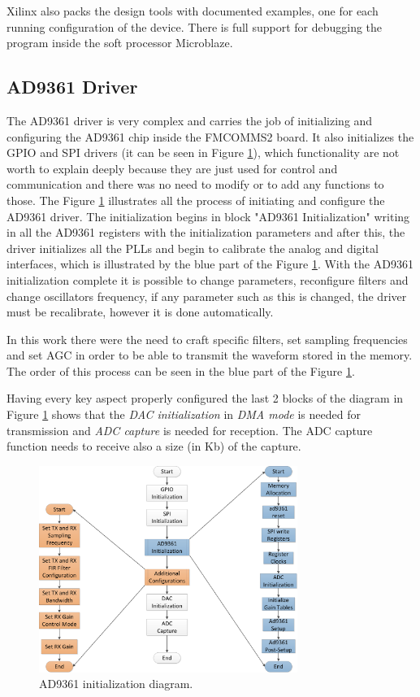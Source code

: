 Xilinx also packs the design tools with documented examples, one for each
running configuration of the device. There is full support for debugging the
program inside the soft processor Microblaze.

\subsection{AD9361 Driver}

The AD9361 driver is very complex and carries the job of initializing and
configuring the AD9361 chip inside the FMCOMMS2 board. It also initializes the
GPIO and SPI drivers (it can be seen in Figure \ref{fig:ad9361init}), which
functionality are not worth to explain deeply because they are just used for
control and communication and there was no need to modify or to add any
functions to those. The Figure \ref{fig:ad9361init} illustrates all the process
of initiating and configure the AD9361 driver.
The initialization begins in block "AD9361 Initialization" writing in all the
AD9361 registers with the initialization parameters and after this, the driver
initializes all the PLLs and begin to calibrate the analog and digital
interfaces, which is illustrated by the blue part of the Figure
\ref{fig:ad9361init}. With the AD9361 initialization complete it is possible to
change parameters, reconfigure filters and  change oscillators frequency, if any
parameter such as this is changed, the driver must be recalibrate, however it is
done automatically.

In this work there were the need to craft specific filters, set sampling
frequencies and set AGC in order to be able to transmit the waveform stored in
the memory. The order of this process can be seen in the blue part of the Figure
\ref{fig:ad9361init}.

Having every key aspect properly configured the last 2 blocks of the diagram in
Figure \ref{fig:ad9361init} shows that the \emph{DAC initialization} in
\textit{DMA mode} is needed for transmission and \emph{ADC capture} is needed
for reception. The ADC capture function needs to receive also a size (in Kb) of
the capture.


\begin{figure}[htbp]
    \centering
    \includegraphics[width=0.75\textwidth]{./figures/ad9361_driver}
    \caption{ AD9361 initialization diagram.
    \label{fig:ad9361init}}
\end{figure}

